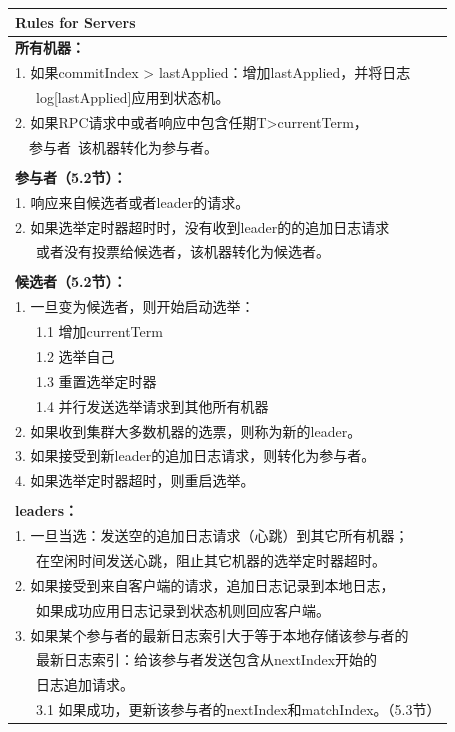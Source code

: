\documentclass[journal]{IEEEtran}
\begin{document}
\begin{table}[htp]
\begin{center}
\begin{tabular}{|p{8.4cm}|}
\hline
\textbf{Rules for Servers}  \\
\hline
\textbf{所有机器：} \\
1. 如果commitIndex > lastApplied：增加lastApplied，并将日志 \\
\ \ \ log[lastApplied]应用到状态机。 \\
2. 如果RPC请求中或者响应中包含任期T>currentTerm，\\
\ \ 参与者\ 该机器转化为参与者。\\
\\
\textbf{参与者（5.2节）：}\\
1. 响应来自候选者或者leader的请求。\\
2. 如果选举定时器超时时，没有收到leader的的追加日志请求\\
\ \ \ 或者没有投票给候选者，该机器转化为候选者。\\
\\
\textbf{候选者（5.2节）：}\\
1. 一旦变为候选者，则开始启动选举：\\
\ \ \ 1.1 增加currentTerm \\
\ \ \ 1.2 选举自己 \\
\ \ \ 1.3 重置选举定时器 \\
\ \ \ 1.4 并行发送选举请求到其他所有机器 \\
2. 如果收到集群大多数机器的选票，则称为新的leader。\\
3. 如果接受到新leader的追加日志请求，则转化为参与者。 \\
4. 如果选举定时器超时，则重启选举。\\
\\
\textbf{leaders：}\\
1. 一旦当选：发送空的追加日志请求（心跳）到其它所有机器；\\
\ \ \ 在空闲时间发送心跳，阻止其它机器的选举定时器超时。\\
2. 如果接受到来自客户端的请求，追加日志记录到本地日志，\\
\ \ \ 如果成功应用日志记录到状态机则回应客户端。\\
3. 如果某个参与者的最新日志索引大于等于本地存储该参与者的 \\ 
\ \ \ 最新日志索引：给该参与者发送包含从nextIndex开始的 \\
\ \ \ 日志追加请求。\\
\ \ \ 3.1 如果成功，更新该参与者的nextIndex和matchIndex。（5.3节）\\

\end{tabular}
\end{center}
\end{table}
\end{document}
